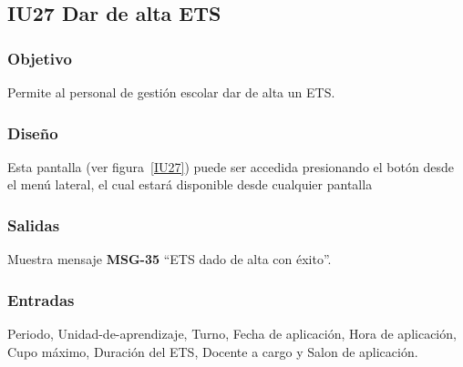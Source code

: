 
\subsection{IU27 Dar de alta ETS}
\subsubsection{Objetivo}
    Permite al personal de gestión escolar dar de alta un ETS.
\subsubsection{Diseño}
    Esta pantalla  (ver figura~\ref{IU27}) puede ser accedida presionando el botón  desde el menú lateral, el cual estará disponible desde cualquier pantalla

\subsubsection{Salidas}
Muestra mensaje {\bf MSG-35} ``ETS  dado de alta con éxito''.
\subsubsection{Entradas}
Periodo, Unidad-de-aprendizaje, Turno, Fecha de aplicación, Hora de aplicación, Cupo máximo, Duración del ETS, Docente a cargo y Salon de aplicación.
